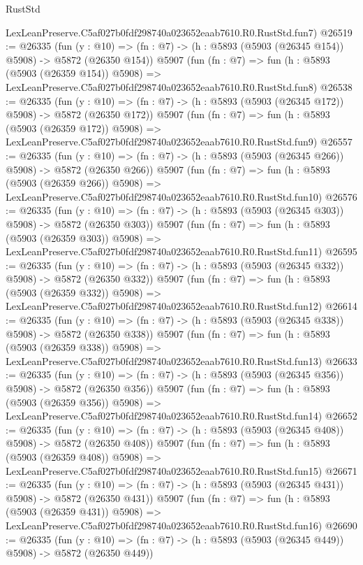 \begin{lexlean}{RustStd}
\begin{coremodule}
    LexLeanPreserve.C5af027b0fdf298740a023652eaab7610.R0.RustStd.fun7)
@26519 := @26335
    (fun (y : @10) => (fn : @7) -> (h : @5893 (@5903 (@26345 @154)) @5908) -> @5872 (@26350 @154))
    @5907
    (fun (fn : @7) =>
    fun (h : @5893 (@5903 (@26359 @154)) @5908) =>
    LexLeanPreserve.C5af027b0fdf298740a023652eaab7610.R0.RustStd.fun8)
@26538 := @26335
    (fun (y : @10) => (fn : @7) -> (h : @5893 (@5903 (@26345 @172)) @5908) -> @5872 (@26350 @172))
    @5907
    (fun (fn : @7) =>
    fun (h : @5893 (@5903 (@26359 @172)) @5908) =>
    LexLeanPreserve.C5af027b0fdf298740a023652eaab7610.R0.RustStd.fun9)
@26557 := @26335
    (fun (y : @10) => (fn : @7) -> (h : @5893 (@5903 (@26345 @266)) @5908) -> @5872 (@26350 @266))
    @5907
    (fun (fn : @7) =>
    fun (h : @5893 (@5903 (@26359 @266)) @5908) =>
    LexLeanPreserve.C5af027b0fdf298740a023652eaab7610.R0.RustStd.fun10)
@26576 := @26335
    (fun (y : @10) => (fn : @7) -> (h : @5893 (@5903 (@26345 @303)) @5908) -> @5872 (@26350 @303))
    @5907
    (fun (fn : @7) =>
    fun (h : @5893 (@5903 (@26359 @303)) @5908) =>
    LexLeanPreserve.C5af027b0fdf298740a023652eaab7610.R0.RustStd.fun11)
@26595 := @26335
    (fun (y : @10) => (fn : @7) -> (h : @5893 (@5903 (@26345 @332)) @5908) -> @5872 (@26350 @332))
    @5907
    (fun (fn : @7) =>
    fun (h : @5893 (@5903 (@26359 @332)) @5908) =>
    LexLeanPreserve.C5af027b0fdf298740a023652eaab7610.R0.RustStd.fun12)
@26614 := @26335
    (fun (y : @10) => (fn : @7) -> (h : @5893 (@5903 (@26345 @338)) @5908) -> @5872 (@26350 @338))
    @5907
    (fun (fn : @7) =>
    fun (h : @5893 (@5903 (@26359 @338)) @5908) =>
    LexLeanPreserve.C5af027b0fdf298740a023652eaab7610.R0.RustStd.fun13)
@26633 := @26335
    (fun (y : @10) => (fn : @7) -> (h : @5893 (@5903 (@26345 @356)) @5908) -> @5872 (@26350 @356))
    @5907
    (fun (fn : @7) =>
    fun (h : @5893 (@5903 (@26359 @356)) @5908) =>
    LexLeanPreserve.C5af027b0fdf298740a023652eaab7610.R0.RustStd.fun14)
@26652 := @26335
    (fun (y : @10) => (fn : @7) -> (h : @5893 (@5903 (@26345 @408)) @5908) -> @5872 (@26350 @408))
    @5907
    (fun (fn : @7) =>
    fun (h : @5893 (@5903 (@26359 @408)) @5908) =>
    LexLeanPreserve.C5af027b0fdf298740a023652eaab7610.R0.RustStd.fun15)
@26671 := @26335
    (fun (y : @10) => (fn : @7) -> (h : @5893 (@5903 (@26345 @431)) @5908) -> @5872 (@26350 @431))
    @5907
    (fun (fn : @7) =>
    fun (h : @5893 (@5903 (@26359 @431)) @5908) =>
    LexLeanPreserve.C5af027b0fdf298740a023652eaab7610.R0.RustStd.fun16)
@26690 := @26335
    (fun (y : @10) => (fn : @7) -> (h : @5893 (@5903 (@26345 @449)) @5908) -> @5872 (@26350 @449))

\end{coremodule}
\end{lexlean}
